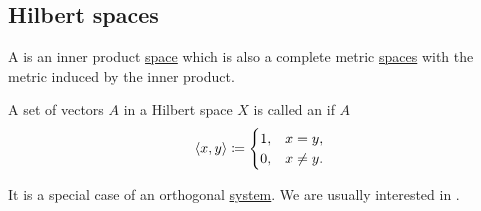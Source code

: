 \subsection{Hilbert spaces}\label{subsec:hilbert_spaces}

\begin{definition}\label{def:hilbert_space}
  A  is an inner product \hyperref[def:inner_product_space]{space} which is also a complete metric \hyperref[def:complete_metric_space]{spaces} with the metric induced by the inner product.
\end{definition}

\begin{definition}\label{def:orthonormal_system}
  A set of vectors \( A \) in a Hilbert space \( X \) is called an  if \( A \)
  \begin{equation*}
    \left\langle x, y \right\rangle \coloneqq \begin{cases}
      1, &x = y, \\
      0, &x \neq y.
    \end{cases}
  \end{equation*}

  It is a special case of an orthogonal \hyperref[def:orthogonality]{system}. We are usually interested in .
\end{definition}
